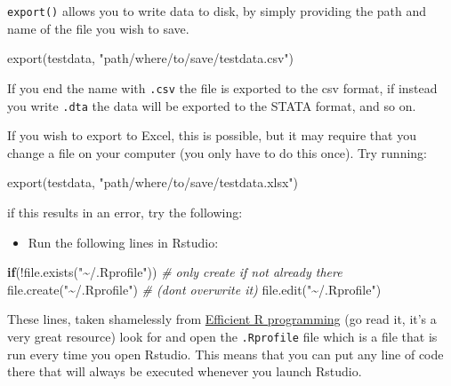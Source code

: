 \documentclass[
]{article}
\newenvironment{Shaded}{\begin{snugshade}}{\end{snugshade}}
\newcommand{\CommentTok}[1]{\textcolor[rgb]{0.56,0.35,0.01}{\textit{#1}}}
\newcommand{\ControlFlowTok}[1]{\textcolor[rgb]{0.13,0.29,0.53}{\textbf{#1}}}
\newcommand{\FunctionTok}[1]{\textcolor[rgb]{0.00,0.00,0.00}{#1}}
\newcommand{\NormalTok}[1]{#1}
\newcommand{\SpecialCharTok}[1]{\textcolor[rgb]{0.00,0.00,0.00}{#1}}
\newcommand{\StringTok}[1]{\textcolor[rgb]{0.31,0.60,0.02}{#1}}
\providecommand{\tightlist}{%
  \setlength{\itemsep}{0pt}\setlength{\parskip}{0pt}}
\begin{document}
\texttt{export()} allows you to write data to disk, by simply providing the path and name of the file you
wish to save.

\begin{Shaded}
\begin{Highlighting}[]
\FunctionTok{export}\NormalTok{(testdata, }\StringTok{"path/where/to/save/testdata.csv"}\NormalTok{)}
\end{Highlighting}
\end{Shaded}

If you end the name with \texttt{.csv} the file is exported to the csv format, if instead you write \texttt{.dta}
the data will be exported to the STATA format, and so on.

If you wish to export to Excel, this is possible, but it may require that you change a file on your
computer (you only have to do this once). Try running:

\begin{Shaded}
\begin{Highlighting}[]
\FunctionTok{export}\NormalTok{(testdata, }\StringTok{"path/where/to/save/testdata.xlsx"}\NormalTok{)}
\end{Highlighting}
\end{Shaded}

if this results in an error, try the following:

\begin{itemize}
\tightlist
\item
  Run the following lines in Rstudio:
\end{itemize}

\begin{Shaded}
\begin{Highlighting}[]
\ControlFlowTok{if}\NormalTok{(}\SpecialCharTok{!}\FunctionTok{file.exists}\NormalTok{(}\StringTok{"\textasciitilde{}/.Rprofile"}\NormalTok{)) }\CommentTok{\# only create if not already there}
    \FunctionTok{file.create}\NormalTok{(}\StringTok{"\textasciitilde{}/.Rprofile"}\NormalTok{)    }\CommentTok{\# (don\textquotesingle{}t overwrite it)}
\FunctionTok{file.edit}\NormalTok{(}\StringTok{"\textasciitilde{}/.Rprofile"}\NormalTok{)}
\end{Highlighting}
\end{Shaded}

These lines, taken shamelessly from \href{https://csgillespie.github.io/efficientR/3-3-r-startup.html\#rprofile}{Efficient R
programming} (go read it,
it's a very great resource) look for and open the \texttt{.Rprofile} file which is a file that is run
every time you open Rstudio. This means that you can put any line of code there that will always be
executed whenever you launch Rstudio.
\end{document}
